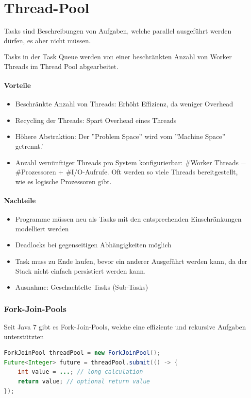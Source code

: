 \section{Thread-Pool}

Tasks sind Beschreibungen von Aufgaben, welche parallel ausgeführt werden dürfen, es aber nicht müssen.

Tasks in der Task Queue werden von einer beschränkten Anzahl von Worker Threads im Thread Pool abgearbeitet.

\paragraph{Vorteile}
\begin{itemize}
	\item Beschränkte Anzahl von Threads: Erhöht Effizienz, da weniger Overhead
	\item Recycling der Threads: Spart Overhead eines Threads
	\item Höhere Abstraktion: Der ''Problem Space'' wird vom ''Machine Space'' getrennt.'
	\item Anzahl vernünftiger Threads pro System konfigurierbar: \#Worker Threads = \#Prozessoren + \#I/O-Aufrufe. Oft werden so viele Threads bereitgestellt, wie es logische Prozessoren gibt.
\end{itemize}

\paragraph{Nachteile}
\begin{itemize}
	\item Programme müssen neu als Tasks mit den entsprechenden Einschränkungen modelliert werden
	\item Deadlocks bei gegenseitigen Abhängigkeiten möglich
	\item Task muss zu Ende laufen, bevor ein anderer Ausgeführt werden kann, da der Stack nicht einfach persistiert werden kann.
	\item Ausnahme: Geschachtelte Tasks (Sub-Tasks)
\end{itemize}

\subsubsection{Fork-Join-Pools}
Seit Java 7 gibt es Fork-Join-Pools, welche eine effiziente und rekursive Aufgaben unterstützten

\begin{lstlisting}[language=java]
ForkJoinPool threadPool = new ForkJoinPool();
Future<Integer> future = threadPool.submit(() -> {
	int value = ...; // long calculation
	return value; // optional return value
});
\end{lstlisting}


